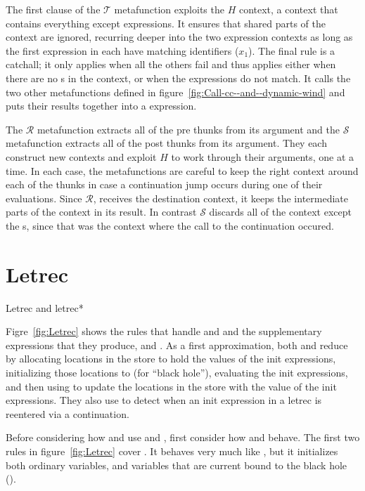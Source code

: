The first clause of the $\mathscr{T}$ metafunction exploits the
$H$ context, a context that contains everything except
 expressions. It ensures that shared parts of the
 context are ignored, recurring deeper into the
two expression contexts as long as the first  expression in
each have matching identifiers ($x_1$). The final rule is a
catchall; it only applies when all the others fail and thus applies
either when there are no s in the context, or when the
 expressions do not match. It calls the two other
metafunctions defined in figure~\ref{fig:Call-cc--and--dynamic-wind} and
puts their results together into a  expression.

The $\mathscr{R}$ metafunction extracts all of the pre
thunks from its argument and the $\mathscr{S}$ metafunction extracts all of the post thunks from its argument. They each construct new contexts and exploit
$H$ to work through their arguments, one  at a time.
In each case, the metafunctions are careful to keep the right
 context around each of the thunks in case a continuation
jump occurs during one of their evaluations. 
Since $\mathscr{R}$,
receives the destination context, it keeps the intermediate
parts of the context in its result.
In contrast
$\mathscr{S}$ discards all of the context except the s,
since that was the context where the call to the
continuation occured.

\section{Letrec}

\beginfig
\begin{center}

\end{center}
\caption{Letrec and letrec*}
\label{fig:Letrec}
\endfig

Figre~\ref{fig:Letrec} shows the rules that handle  and  and the supplementary expressions that they produce,  and . As a first approximation, both  and  reduce by allocating locations in the store to hold the values of the init expressions, initializing those locations to  (for ``black hole''), evaluating the init expressions, and then using  to update the locations in the store with the value of the init expressions. They also use  to detect when an init expression in a letrec is reentered via a continuation.

Before considering how  and  use  and , first consider how  and  behave. The first two rules in figure~\ref{fig:Letrec} cover . It behaves very much like , but it initializes both ordinary variables, and variables that are current bound to the black hole ().

